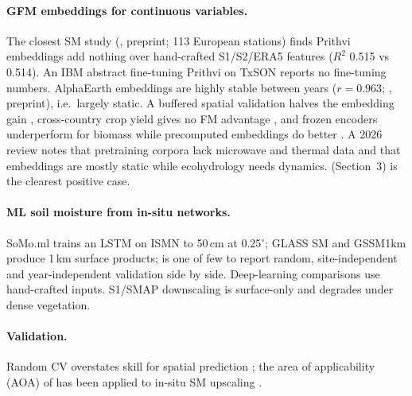 \documentclass[11pt,a4paper]{article}
\begin{document}
\paragraph{GFM embeddings for continuous variables.} The closest SM study
(\citealp{kontogiorgakis2026sm}, preprint; 113 European stations) finds Prithvi embeddings add nothing
over hand-crafted S1/S2/ERA5 features ($R^2$ 0.515 vs 0.514). An IBM abstract fine-tuning Prithvi on
TxSON \citep{chavda2024ibm} reports no fine-tuning numbers. AlphaEarth embeddings are highly stable
between years ($r=0.963$; \citealp{rahman2026aef}, preprint), i.e.\ largely static. A buffered spatial
validation halves the embedding gain \citep{ratsakatika2026buffer}, cross-country crop yield gives no
FM advantage \citep{adjei2026yield}, and frozen encoders underperform for biomass while precomputed
embeddings do better \citep{sialelli2026agb}. A 2026 review \citep{yu2026ecohydro} notes that
pretraining corpora lack microwave and thermal data and that embeddings are mostly static while
ecohydrology needs dynamics. \citet{fang2026alphaearth} (Section~3) is the clearest positive case.

\paragraph{ML soil moisture from in-situ networks.} SoMo.ml \citep{o2021somo} trains an LSTM on
ISMN to 50\,cm at 0.25$^\circ$; GLASS SM \citep{zhang2023glass} and GSSM1km \citep{han2023gssm}
produce 1\,km surface products; \citet{zhang2023glass} is one of few to report random,
site-independent and year-independent validation side by side. Deep-learning comparisons
\citep{fang2017lstm,wang2024hess} use hand-crafted inputs. S1/SMAP downscaling
\citep{das2019smap,bauer2019s1} is surface-only and degrades under dense vegetation.

\paragraph{Validation.} Random CV overstates skill for spatial prediction
\citep{ploton2020spatial,meyer2022maps}; the area of applicability (AOA) of
\citet{meyer2021aoa} has been applied to in-situ SM upscaling \citep{yu2025aoa}.
\end{document}
